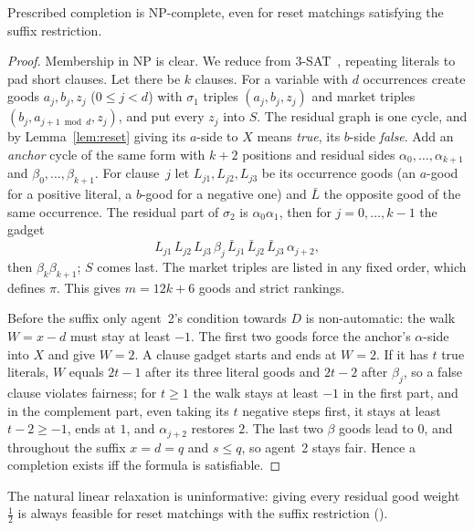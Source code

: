 \documentclass[sigconf,anonymous]{aamas}
\begin{document}
\begin{theorem}\label{thm:hard}
Prescribed completion is NP-complete, even for reset matchings satisfying the suffix restriction.
\end{theorem}
\begin{proof}
Membership in NP is clear. We reduce from 3-SAT~\citep{karp1972}, repeating literals to pad short clauses. Let there be $k$ clauses. For a variable with $d$ occurrences create goods $a_j,b_j,z_j$ ($0\le j<d$) with $\sigma_1$ triples $(a_j,b_j,z_j)$ and market triples $(b_j,a_{j+1\bmod d},z_j)$, and put every $z_j$ into $S$. The residual graph is one cycle, and by Lemma~\ref{lem:reset} giving its $a$-side to $X$ means \emph{true}, its $b$-side \emph{false}. Add an \emph{anchor} cycle of the same form with $k+2$ positions and residual sides $\alpha_0,\dots,\alpha_{k+1}$ and $\beta_0,\dots,\beta_{k+1}$. For clause~$j$ let $L_{j1},L_{j2},L_{j3}$ be its occurrence goods (an $a$-good for a positive literal, a $b$-good for a negative one) and $\bar L$ the opposite good of the same occurrence. The residual part of $\sigma_2$ is $\alpha_0\alpha_1$, then for $j=0,\dots,k-1$ the gadget
\begin{equation}
L_{j1}\,L_{j2}\,L_{j3}\,\beta_j\,\bar L_{j1}\,\bar L_{j2}\,\bar L_{j3}\,\alpha_{j+2},\label{eq:gadget}
\end{equation}
then $\beta_k\beta_{k+1}$; $S$ comes last. The market triples are listed in any fixed order, which defines $\pi$. This gives $m=12k+6$ goods and strict rankings.

Before the suffix only agent~2's condition towards $D$ is non-automatic: the walk $W=x-d$ must stay at least $-1$. The first two goods force the anchor's $\alpha$-side into $X$ and give $W=2$. A clause gadget starts and ends at $W=2$. If it has $t$ true literals, $W$ equals $2t-1$ after its three literal goods and $2t-2$ after $\beta_j$, so a false clause violates fairness; for $t\ge1$ the walk stays at least $-1$ in the first part, and in the complement part, even taking its $t$ negative steps first, it stays at least $t-2\ge-1$, ends at $1$, and $\alpha_{j+2}$ restores $2$. The last two $\beta$ goods lead to $0$, and throughout the suffix $x=d=q$ and $s\le q$, so agent~2 stays fair. Hence a completion exists iff the formula is satisfiable.
\end{proof}
The natural linear relaxation is uninformative: giving every residual good weight $\tfrac12$ is always feasible for reset matchings with the suffix restriction (\appComplexity).
\end{document}
